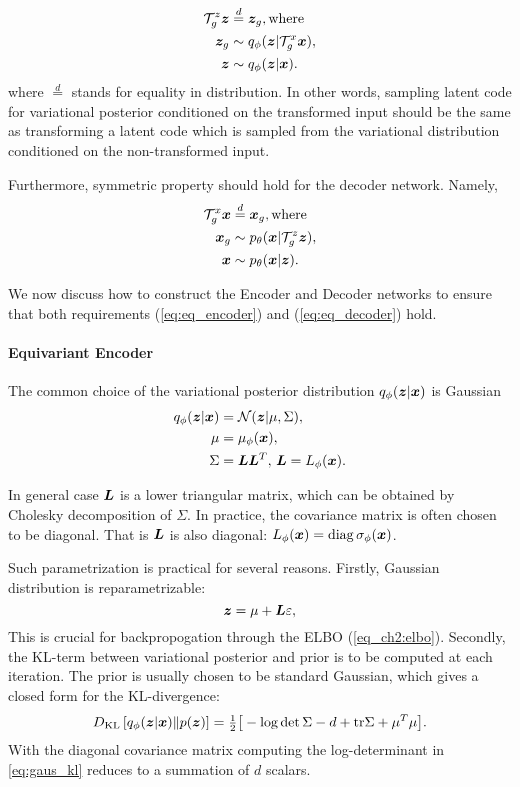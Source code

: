 \begin{align}
    \gT_g^z \vz &\stackrel{d}{=} \vz_g, \text{where}\label{eq:eq_encoder}\\ 
     \vz_g &\sim q_{\phi}(\vz| \gT_g^x \vx),\\
     \vz &\sim q_{\phi}(\vz| \vx).
\end{align}
where $\stackrel{d}{=}$ stands for equality in distribution. In other words, sampling latent code for variational posterior conditioned on the transformed input should be the same as transforming a latent code which is sampled from the variational distribution conditioned on the non-transformed input.  

Furthermore, symmetric property should hold for the decoder network. Namely,
\begin{align}
    \gT_g^x \vx &\stackrel{d}{=} \vx_g, \text{where} \label{eq:eq_decoder}\\
    \vx_g &\sim p_{\theta}(\vx| \gT_g^z \vz),\\
    \vx &\sim p_{\theta}(\vx| \vz).
\end{align}

We now discuss how to construct the Encoder and Decoder networks to ensure that both requirements (\ref{eq:eq_encoder}) and (\ref{eq:eq_decoder}) hold.

\paragraph{Equivariant Encoder}
The common choice of the variational posterior distribution $q_{\phi}({\bm{z}}|{\bm{x}})$ is Gaussian 
\begin{align}
    q_{\phi}(\vz|\vx) &= \mathcal{N}(\vz| \mu, \Sigma), \label{eq:var_posterior}\\
    \mu &= \mu_{\phi}(\vx), \notag \\
    \Sigma &= \mL\mL^T, \, \mL = L_{\phi}(\vx). \notag
\end{align}

In general case ${\bm{L}}$ is a lower triangular matrix, which can be obtained by Cholesky decomposition of $\Sigma$. 
In practice, the covariance matrix is often chosen to be diagonal. That is ${\bm{L}}$ is also diagonal: $L_{\phi}({\bm{x}}) = \operatorname{diag} \sigma_{\phi}({\bm{x}})$. 

Such parametrization is practical for several reasons. Firstly, Gaussian distribution is reparametrizable:
\begin{equation}
    {\bm{z}} = \mu +  {\bm{L}}\varepsilon,
\end{equation}
This is crucial for backpropogation through the ELBO (\ref{eq_ch2:elbo}). Secondly, the KL-term between variational posterior and prior is to be computed at each iteration. The prior is usually chosen to be standard Gaussian, which gives a closed form for the KL-divergence:
\begin{align} \label{eq:gaus_kl}
    \KL{q_{\phi}(\vz|\vx)}{p(\vz)} = \tfrac{1}{2}\big[-\log\det\Sigma - d + 
    \text{tr}\Sigma + \mu^T\mu \big]. 
\end{align}
With the diagonal covariance matrix computing the log-determinant in \eqref{eq:gaus_kl} reduces to a summation of $d$ scalars.

